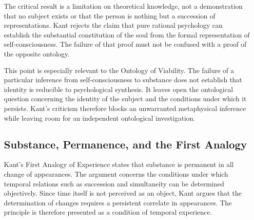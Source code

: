 \label{para:VS.B01.P01.C08.S10.SS08.P004}

The critical result is a limitation on
theoretical knowledge, not a demonstration
that no subject exists or that the person
is nothing but a succession of representations.
Kant rejects the claim that pure rational
psychology can establish the substantial
constitution of the soul from the formal
representation of self-consciousness. The
failure of that proof must not be confused
with a proof of the opposite ontology.

\label{para:VS.B01.P01.C08.S10.SS08.P005}

This point is especially relevant to the
Ontology of Viability. The failure of a
particular inference from self-consciousness
to substance does not establish that identity
is reducible to psychological synthesis.
It leaves open the ontological question
concerning the identity of the subject and
the conditions under which it persists.
Kant's criticism therefore blocks an
unwarranted metaphysical inference while
leaving room for an independent ontological
investigation.



\subsection{Substance, Permanence, and the First Analogy}
\label{subsec:ch08-kant-substance}

\label{para:VS.B01.P01.C08.S10.SS09.P001}

Kant's First Analogy of Experience states that
substance is permanent in all change of
appearances. The argument concerns the
conditions under which temporal relations
such as succession and simultaneity can be
determined objectively. Since time itself
is not perceived as an object, Kant argues
that the determination of changes requires
a persistent correlate in appearances.
The principle is therefore presented as
a condition of temporal experience.
\cite[A182/B224--A189/B232]{KantCritiquePureReason}

\label{para:VS.B01.P01.C08.S10.SS09.P002}

